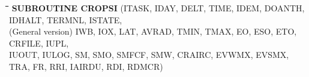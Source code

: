 \documentclass[11pt]{article}
\begin{document}
\nwln
\begin{tabbing}
\hspace{1.27cm}\=\hspace{1.27cm}\=\hspace{1.27cm}\=\hspace{1.27cm}\=%
\hspace{1.27cm}\=\hspace{1.27cm}\=\hspace{1.27cm}\=\hspace{1.27cm}\=%
\hspace{1.27cm}\=\hspace{1.27cm}\=\kill
{\bf SUBROUTINE CROPSI}\> \> \> (ITASK, IDAY, DELT, TIME, IDEM, DOANTH, IDHALT, TERMNL, ISTATE,\\
(General version)\> \> \>  IWB, IOX, LAT, AVRAD, TMIN, TMAX, EO, ESO, ETO, CRFILE, IUPL,\\
\>\> \>  IUOUT, IULOG, SM, SMO, SMFCF, SMW, CRAIRC, EVWMX, EVSMX,\\
 \>\> \>  TRA, FR, RRI, IAIRDU, RDI, RDMCR)
\end{tabbing}
\nwln
\end{document}
